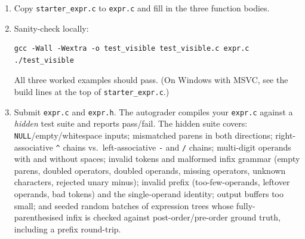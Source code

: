 \documentclass[11pt]{article}
\begin{document}
\begin{enumerate}
  \item Copy \texttt{starter\_expr.c} to \texttt{expr.c} and fill in the three function bodies.
  \item Sanity-check locally:
\begin{verbatim}
gcc -Wall -Wextra -o test_visible test_visible.c expr.c
./test_visible
\end{verbatim}
    All three worked examples should pass. (On Windows with MSVC, see the build lines at the top of \texttt{starter\_expr.c}.)
  \item Submit \texttt{expr.c} and \texttt{expr.h}. The autograder compiles your \texttt{expr.c} against a \emph{hidden} test suite and reports pass/fail. The hidden suite covers: \texttt{NULL}/empty/whitespace inputs; mismatched parens in both directions; right-associative \texttt{\^{}} chains vs.\ left-associative \texttt{-} and \texttt{/} chains; multi-digit operands with and without spaces; invalid tokens and malformed infix grammar (empty parens, doubled operators, doubled operands, missing operators, unknown characters, rejected unary minus); invalid prefix (too-few-operands, leftover operands, bad tokens) and the single-operand identity; output buffers too small; and seeded random batches of expression trees whose fully-parenthesised infix is checked against post-order/pre-order ground truth, including a prefix round-trip.
\end{enumerate}
\end{document}
